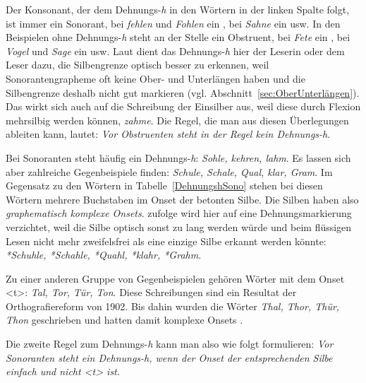 Der Konsonant, der dem Dehnungs-\textit{h} in den Wörtern in der linken Spalte folgt, ist immer ein Sonorant, bei \textit{fehlen} und \textit{Fohlen} ein , bei \textit{Sahne} ein  usw. In den Beispielen ohne Dehnungs-\textit{h} steht an der Stelle ein Obstruent, bei \textit{Fete} ein , bei \textit{Vogel} und \textit{Sage} ein  usw. Laut \citet[225]{FuhrhopPeters2013} dient das Dehnungs-\textit{h} hier der Leserin oder dem Leser dazu, die Silbengrenze optisch besser zu erkennen, weil Sonorantengrapheme oft keine Ober- und Unterlängen haben und die Silbengrenze deshalb nicht gut markieren (vgl. Abschnitt~\ref{sec:OberUnterlängen}). Das wirkt sich auch auf die Schreibung der Einsilber aus, weil diese durch Flexion mehrsilbig werden können, \zB \textit{zahme}. Die Regel, die man aus diesen Überlegungen ableiten kann, lautet: \textit{Vor Obstruenten steht in der Regel kein Dehnungs-\textit{h}}.

Bei Sonoranten steht häufig ein Dehnungs-\textit{h}: \textit{Sohle, kehren, lahm}. Es lassen sich aber zahlreiche Gegenbeispiele finden: \textit{Schule, Schale, Qual, klar, Gram}. Im Gegensatz zu den Wörtern in Tabelle~\ref{DehnungshSono} stehen bei diesen Wörtern mehrere Buchstaben im Onset der betonten Silbe. Die Silben haben also \textit{graphematisch komplexe Onsets}. \citet[225]{FuhrhopPeters2013} zufolge wird hier auf eine Dehnungsmarkierung verzichtet, weil die Silbe optisch sonst zu lang werden würde und beim flüssigen Lesen nicht mehr zweifelsfrei als eine einzige Silbe erkannt werden könnte: \textit{*Schuhle, *Schahle, *Quahl, *klahr, *Grahm}.

Zu einer anderen Gruppe von Gegenbeispielen gehören Wörter mit dem Onset <t>: \textit{Tal, Tor, Tür, Ton}. Diese Schreibungen sind ein Resultat der Orthografiereform von 1902. Bis dahin wurden die Wörter \textit{Thal, Thor, Thür, Thon} geschrieben und hatten damit komplexe Onsets \citep[166]{Roeber2013}.

Die zweite Regel zum Dehnungs-\textit{h} kann man also wie folgt formulieren: \textit{Vor Sonoranten steht ein Dehnungs-\textit{h}, wenn der Onset der entsprechenden Silbe einfach und nicht <t> ist.}


